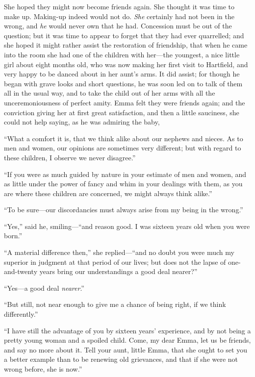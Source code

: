 She hoped they might now become friends again.  She thought it
was time to make up.  Making-up indeed would not do.  \emph{She} certainly
had not been in the wrong, and \emph{he} would never own that he had.
Concession must be out of the question; but it was time to appear
to forget that they had ever quarrelled; and she hoped it might rather
assist the restoration of friendship, that when he came into the room
she had one of the children with her---the youngest, a nice little girl
about eight months old, who was now making her first visit to Hartfield,
and very happy to be danced about in her aunt's arms.  It did assist;
for though he began with grave looks and short questions, he was soon
led on to talk of them all in the usual way, and to take the child
out of her arms with all the unceremoniousness of perfect amity.
Emma felt they were friends again; and the conviction giving
her at first great satisfaction, and then a little sauciness,
she could not help saying, as he was admiring the baby,

``What a comfort it is, that we think alike about our nephews and nieces.
As to men and women, our opinions are sometimes very different;
but with regard to these children, I observe we never disagree.''

``If you were as much guided by nature in your estimate of men
and women, and as little under the power of fancy and whim in your
dealings with them, as you are where these children are concerned,
we might always think alike.''

``To be sure---our discordancies must always arise from my being
in the wrong.''

``Yes,'' said he, smiling---``and reason good.  I was sixteen years
old when you were born.''

``A material difference then,'' she replied---``and no doubt you were
much my superior in judgment at that period of our lives; but does
not the lapse of one-and-twenty years bring our understandings
a good deal nearer?''

``Yes---a good deal \emph{nearer}.''

``But still, not near enough to give me a chance of being right,
if we think differently.''

``I have still the advantage of you by sixteen years' experience, and by
not being a pretty young woman and a spoiled child.  Come, my dear Emma,
let us be friends, and say no more about it.  Tell your aunt, little Emma,
that she ought to set you a better example than to be renewing
old grievances, and that if she were not wrong before, she is now.''

